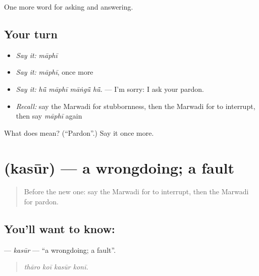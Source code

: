 \begin{grammarlens}[title={What you've built}]
One more word for asking and answering.
\end{grammarlens}

\subsection*{Your turn}
\begin{itemize}
\raggedright
  \item \emph{Say it:} \emph{māphī}
  \item \emph{Say it:} \emph{māphī}, once more
  \item \emph{Say it:} \emph{hū̃ māphī māṅgū̃ hū̃.} — I'm sorry: I ask your pardon.
  \item \emph{Recall:} say the Marwadi for stubbornness, then the Marwadi for to interrupt, then say \emph{māphī} again
\end{itemize}

\begin{tcolorbox}[breakable,colback=teal!4,colframe=teal!35!black,title={Before you move on}]
What does  mean? (\textquotedblleft{}Pardon\textquotedblright{}.) Say it once more.
\end{tcolorbox}
\section[\texorpdfstring{\mw{कसूर} (kasūr)}{कसूर (kasūr)}]{ (kasūr) — a wrongdoing; a fault}

\label{lesson:MW-C270-kasur}



\begin{quote}
Before the new one: say the Marwadi for to interrupt, then the Marwadi for pardon.
\end{quote}

\subsection*{You'll want to know: }
\textbf{} — \emph{kasūr} — \textquotedblleft{}a wrongdoing; a fault\textquotedblright{}.

\begin{quote}
   
\end{quote}

\begin{quote}
\emph{thāro koī kasūr konī.}
\end{quote}

